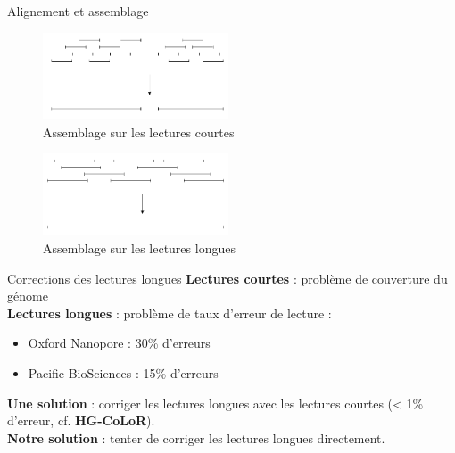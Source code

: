 \documentclass[11pt]{beamer}
\begin{document}
\begin{frame}[fragile]{Alignement et assemblage}
  \begin{figure}
    \includegraphics[width=55mm]{assemblage_courts}
    \caption{Assemblage sur les lectures courtes}
  \end{figure}
  \pause
  \begin{figure}
    \includegraphics[width=55mm]{assemblage_longs}
    \caption{Assemblage sur les lectures longues}
  \end{figure}
\end{frame}

\begin{frame}[fragile]{Corrections des lectures longues}
  \textbf{Lectures courtes} : problème de couverture du génome\medskip\pause\\
  \textbf{Lectures longues} : problème de taux d'erreur de lecture :\pause
  \begin{itemize}[<+-| alert@+>]
    \item Oxford Nanopore : 30\% d'erreurs
    \item Pacific BioSciences : 15\% d'erreurs
  \end{itemize}\pause
  \textbf{Une solution} : corriger les lectures longues avec les lectures courtes (< 1\% d'erreur, cf. \textbf{HG-CoLoR}\cite{Morisse2017}).\medskip\pause\\
  \textbf{Notre solution} : tenter de corriger les lectures longues directement.
\end{frame}
\end{document}
